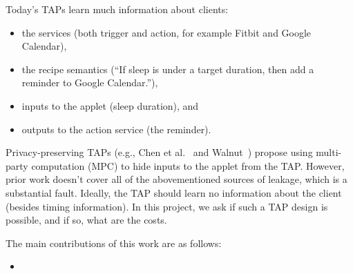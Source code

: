 Today's TAPs learn much information about clients:
\begin{itemize}[leftmargin=*]
  \item the services (both trigger and action, for example Fitbit and Google Calendar),
  \item the recipe semantics (``If sleep is under a target duration, then add a
    reminder to Google Calendar.''),
  \item inputs to the applet (sleep duration), and
  \item outputs to the action service (the reminder).
\end{itemize}

Privacy-preserving TAPs (e.g., Chen et al.~\cite{DBLP:conf/sp/ChenCWSCF21} and
Walnut~\cite{DBLP:journals/corr/abs-2009-12447}) propose using multi-party
computation (MPC) to hide inputs to the applet from the TAP. However, prior work
doesn't cover all of the abovementioned sources of leakage, which is a
substantial fault. Ideally, the TAP should learn no information about the client
(besides timing information). In this project, we ask if such a TAP design is
possible, and if so, what are the costs.

The main contributions of this work are as follows:
\begin{itemize}[leftmargin=*]
  \item {}
\end{itemize}
